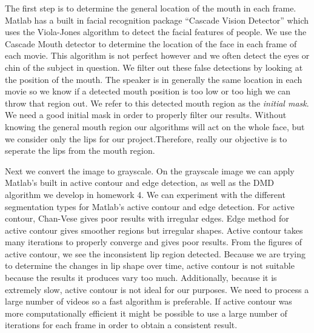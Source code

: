 \documentclass[a4paper]{article}
\begin{document}
The first step is to determine the general location of the mouth in each frame. Matlab has a built in facial recognition package ``Cascade Vision Detector'' which uses the Viola-Jones algorithm to detect the facial features of people. We use the Cascade Mouth detector to determine the location of the face in each frame of each movie. This algorithm is not perfect however and we often detect the eyes or chin of the subject in question. We filter out these false detections by looking at the position of the mouth. The speaker is in generally the same location in each movie so we know if a detected mouth position is too low or too high we can throw that region out. We refer to this detected mouth region as the \textit{initial mask}. We need a good initial mask in order to properly filter our results. Without knowing the general mouth region our algorithms will act on the whole face, but we consider only the lips for our project.Therefore, really our objective is to seperate the lips from the mouth region.\par
Next we convert the image to grayscale. On the grayscale image we can apply Matlab's built in active contour and edge detection, as well as the DMD algorithm we develop in homework 4. We can experiment with the different segmentation types for Matlab's active contour and edge detection. For active contour, Chan-Vese gives poor results with irregular edges. Edge method for active contour gives smoother regions but irregular shapes. Active contour takes many iterations to properly converge and gives poor results. From the figures of active contour, we see the inconsistent lip region detected. Because we are trying to determine the changes in lip shape over time, active contour is not suitable because the results it produces vary too much. Additionally, because it is extremely slow, active contour is not ideal for our purposes. We need to process a large number of videos so a fast algorithm is preferable. If active contour was more computationally efficient it might be possible to use a large number of iterations for each frame in order to obtain a consistent result.  \par
\end{document}
